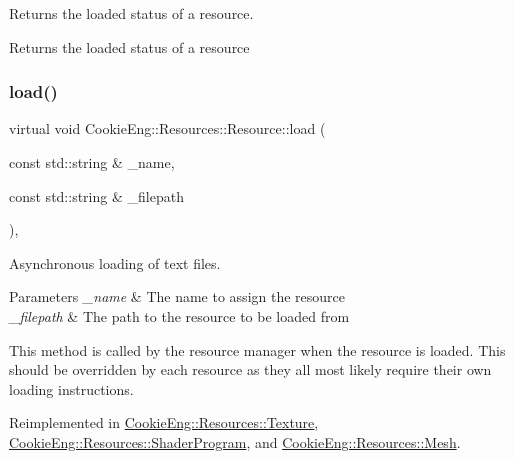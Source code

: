 Returns the loaded status of a resource. 

Returns the loaded status of a resource \mbox{\label{class_cookie_eng_1_1_resources_1_1_resource_a75648b8f2e442bebc90d6eb4ea3a2f6e}} 
\subsubsection{\texorpdfstring{load()}{load()}}
{\footnotesize\ttfamily virtual void Cookie\+Eng\+::\+Resources\+::\+Resource\+::load (\begin{DoxyParamCaption}\item[{const std\+::string \&}]{\+\_\+name,  }\item[{const std\+::string \&}]{\+\_\+filepath }\end{DoxyParamCaption})\hspace{0.3cm}{\ttfamily [inline]}, {\ttfamily [virtual]}}



Asynchronous loading of text files. 


\begin{DoxyParams}{Parameters}
{\em \+\_\+name} & The name to assign the resource \\
\hline
{\em \+\_\+filepath} & The path to the resource to be loaded from\\
\hline
\end{DoxyParams}
This method is called by the resource manager when the resource is loaded. This should be overridden by each resource as they all most likely require their own loading instructions. 

Reimplemented in \hyperlink{class_cookie_eng_1_1_resources_1_1_texture_a1f2d72c781dba6262ac5ca6e8898fc8d}{Cookie\+Eng\+::\+Resources\+::\+Texture}, \hyperlink{class_cookie_eng_1_1_resources_1_1_shader_program_aef29916bad667d1f820053fd891d9e58}{Cookie\+Eng\+::\+Resources\+::\+Shader\+Program}, and \hyperlink{struct_cookie_eng_1_1_resources_1_1_mesh_ae31053c6edaf0e735d85350bfa6093fb}{Cookie\+Eng\+::\+Resources\+::\+Mesh}.

\mbox{\label{class_cookie_eng_1_1_resources_1_1_resource_a9ad88ddeec633dbb1df1b6f1f8ff4c47}} 
